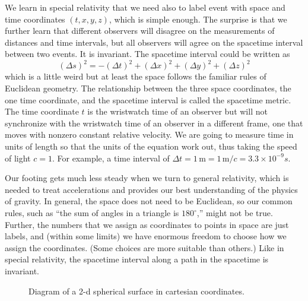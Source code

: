 We learn in special relativity that we need also to label event with space and time coordinates $(t,x,y,z)$, which is simple enough.  The surprise is that we further learn that different observers will disagree on the measurements of distances and time intervals, but all observers will agree on the spacetime interval between two events.  It is invariant.  The spacetime interval could be written as
\begin{equation}
  (\Delta s)^2 = -(\Delta t)^2 +  (\Delta x)^2 + (\Delta y)^2 + (\Delta z)^2
\end{equation}
which is a little weird but at least the space follows the familiar rules of Euclidean geometry.  The relationship between the three space coordinates, the one time coordinate, and the spacetime interval is called the spacetime metric.  The time coordinate $t$ is the wristwatch time of an observer but will not synchronize with the wristwatch time of an observer in a different frame, one that moves with nonzero constant relative velocity.  We are going to measure time in units of length so that the units of the equation work out, thus taking the speed of light $c=1$.  For example, a time interval of $\Delta t = 1\,\mbox{m} = 1\,\mbox{m}/c = 3.3\times10^{-9} s$.

Our footing gets much less steady when we turn to general relativity, which is needed to treat accelerations and provides our best understanding of the physics of gravity.  In general, the space does not need to be Euclidean, so our common rules, such as ``the sum of angles in a triangle is $180^\circ$,'' might not be true.  Further, the numbers that we assign as coordinates to points in space are just labels, and (within some limits) we have enormous freedom to choose how we assign the coordinates.  (Some choices are more suitable than others.)  Like in special relativity, the spacetime interval along a path in the spacetime is invariant.

\begin{figure}
  \caption{Diagram of a 2-d spherical surface in cartesian coordinates.}
\end{figure}

